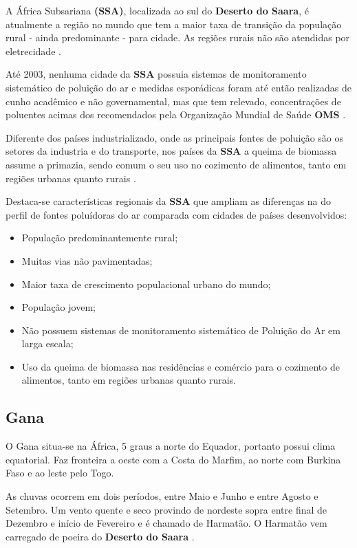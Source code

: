 A África Subsariana \textbf{(SSA)}, localizada ao sul do 
\textbf{Deserto do Saara}, é atualmente a região no mundo que tem a maior 
taxa de transição da população rural - ainda predominante - para cidade. 
As regiões rurais não são atendidas por eletrecidade \citep{MONTGOMERY2008}.

Até 2003, nenhuma cidade da \textbf{SSA} possuia sistemas de monitoramento 
sistemático de poluição do ar e medidas esporádicas foram até então realizadas
de cunho acadêmico e não governamental, mas que tem relevado, concentrações
de poluentes acimas dos recomendados pela Organização Mundial de Saúde \textbf{OMS} 
\citep{EZZATI2004}. 

Diferente dos países industrializado, onde as principais fontes de poluição 
são os setores da industria e do transporte, nos países da \textbf{SSA} a 
queima de biomassa assume a primazia, sendo comum o seu uso no cozimento 
de alimentos, tanto em regiões urbanas quanto rurais \citep{SMITH2004}. 

Destaca-se características regionais da \textbf{SSA} que ampliam as diferenças 
na do perfil de fontes poluídoras do ar comparada com cidades de países desenvolvidos: 

\begin{itemize}
  \item População predominantemente rural;
  \item Muitas vias não pavimentadas;
  \item Maior taxa de crescimento populacional urbano do mundo;
  \item População jovem;
  \item Não possuem sistemas de monitoramento sistemático de Poluição do Ar em larga escala;
  \item Uso da queima de biomassa nas residências e comércio para o cozimento de alimentos,
        tanto em regiões urbanas quanto rurais.
\end{itemize}

\subsection{Gana}

O Gana situa-se na África, 5 graus a norte do Equador, portanto possui clima
equatorial. Faz fronteira a oeste com a Costa do Marfim, ao norte com Burkina 
Faso e ao leste pelo Togo. 

As chuvas ocorrem em dois períodos, entre Maio e Junho e entre Agosto e Setembro.
Um vento quente e seco provindo de nordeste sopra entre final de Dezembro
e início de Fevereiro e é chamado de Harmatão. O Harmatão vem carregado de 
poeira do \textbf{Deserto do Saara} \citep{breuning2005}.

